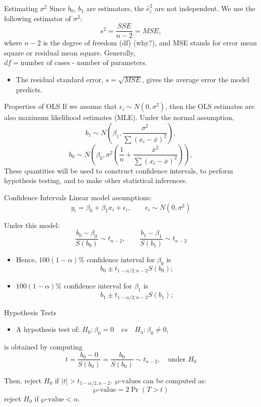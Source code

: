 \documentclass[
  ignorenonframetext,
]{beamer}
\providecommand{\tightlist}{%
  \setlength{\itemsep}{0pt}\setlength{\parskip}{0pt}}
\begin{document}
\begin{frame}{Estimating \(\sigma^2\)}
\protect{}\label{estimating-sigma2-1}
Since \(b_0\), \(b_1\) are estimators, the \(\hat{e}_i^2\) are not
independent. We use the following estimator of \(\sigma^2\):
\[ s^2=\frac{SSE}{n-2}=MSE,\] where \(n-2\) is the degree of freedom
(df) (why?), and MSE stands for error mean square or residual mean
square. Generally, \(df=\text{number of cases - number of parameters}\).

\begin{itemize}
\tightlist
\item
  The residual standard error, \(s=\sqrt{MSE}\), gives the average error
  the model predicts.
\end{itemize}
\end{frame}

\begin{frame}{Properties of OLS}
\protect{}\label{properties-of-ols}
If we assume that \(\epsilon_i \sim N(0, \sigma^2)\), then the OLS
estimates are also maximum likelihood estimates (MLE). Under the normal
assumption,
\[b_1\sim N\left(\beta_1 , \frac{\sigma^2}{\sum(x_i-\bar{x})^2}\right),\]
\[b_0\sim N\left(\beta_0 , \sigma^2\left(\frac{1}{n}+\frac{\bar{x}^2}{\sum(x_i-\bar{x})^2}\right)\right),\]
These quantities will be used to construct confidence intervals, to
perform hypothesis testing, and to make other statistical inferences.
\end{frame}

\begin{frame}{Confidence Intervals}
\protect{}\label{confidence-intervals}
Linear model assumptions:
\[y_i=\beta_0+\beta_1 x_i+\epsilon_i, \quad \quad \epsilon_i \sim N(0, \sigma^2)\]

Under this model:
\[\frac{b_0-\beta_0}{S(b_0)}\sim t_{n-2}, \quad \quad \frac{b_1-\beta_1}{S(b_1)}\sim t_{n-2}\]

\begin{itemize}
\tightlist
\item
  Hence, \(100(1-\alpha)\%\) confidence interval for \(\beta_0\) is
  \[b_0\pm t_{1 -\alpha/2; n- 2}S(b_0);\]
\item
  \(100(1-\alpha)\%\) confidence interval for \(\beta_1\) is
  \[b_1\pm t_{1 - \alpha/2; n - 2}S(b_1);\]
\end{itemize}
\end{frame}

\begin{frame}{Hypothesis Tests}
\protect{}\label{hypothesis-tests}
\begin{itemize}
\tightlist
\item
  A hypothesis test of:
  \(H_0: \beta_0=0\quad vs \quad H_a: \beta_0\neq 0\),
\end{itemize}

is obtained by computing
\[ t=\frac{b_0-0}{S(b_0)}=\frac{b_0}{S(b_0)}\sim t_{n-2}, \quad \text{under } H_0\]

Then, reject \(H_0\) if \(|t|>t_{1-\alpha/2, n-2}\).
\(\wp\text{-value}\)s can be computed as: \[\wp\text{-value}=2\Pr(T>t)\]
reject \(H_0\) if \(\wp\text{-value}<\alpha\).
\end{frame}
\end{document}
